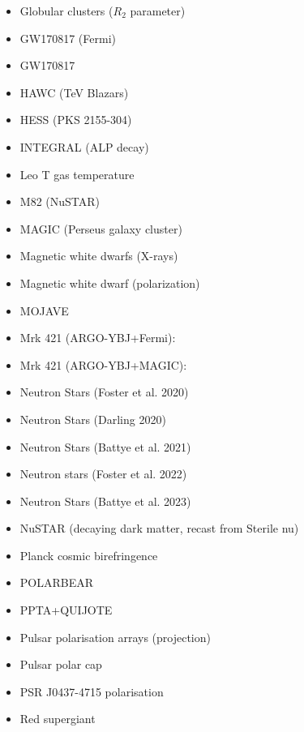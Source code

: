 \documentclass[8pt,twocolumn]{extarticle}
\begin{document}
\begin{mdframed}[everyline=true]
\begin{itemize}
    \item Globular clusters ($R_2$ parameter)~\cite{Dolan:2022kul}
    \item GW170817 (Fermi)~\cite{Dev:2023hax}
    \item GW170817 ~\cite{Diamond:2023cto}
    \item HAWC (TeV Blazars)~\cite{Jacobsen:2022swa}
    \item HESS (PKS 2155-304)~\cite{HESS:2013udx}
    \item INTEGRAL (ALP decay)~\cite{Calore:2022pks}
    \item Leo T gas temperature~\cite{Wadekar:2021qae}
    \item M82 (NuSTAR)~\cite{Ning:2024eky}
    \item MAGIC (Perseus galaxy cluster)~\cite{MAGIC:2024arq}
    \item Magnetic white dwarfs (X-rays)~\cite{Dessert:2021bkv}
    \item Magnetic white dwarf (polarization)~\cite{Dessert:2022yqq}
    \item MOJAVE~\cite{Ivanov:2018byi}
    \item Mrk 421 (ARGO-YBJ+Fermi):~\cite{Li:2020pcn}
    \item Mrk 421 (ARGO-YBJ+MAGIC):~\cite{Li:2021gxs}
    \item Neutron Stars (Foster et al. 2020)~\cite{Foster:2020pgt}
    \item Neutron Stars (Darling 2020)~\cite{Darling:2020uyo}
    \item Neutron Stars (Battye et al. 2021)~\cite{Battye:2021yue}
    \item Neutron stars (Foster et al. 2022)~\cite{Foster:2022fxn}
    \item Neutron Stars (Battye et al. 2023)~\cite{Battye:2023oac}
    \item NuSTAR (decaying dark matter, recast from Sterile nu)~\cite{Perez:2016tcq,Ng:2019gch,Roach:2022lgo}
   	\item Planck cosmic birefringence~\cite{Fedderke:2019ajk}
   	\item POLARBEAR~\cite{POLARBEAR:2023ric,POLARBEAR:2024vel}
    \item PPTA+QUIJOTE~\cite{Castillo:2022zfl}
    \item Pulsar polarisation arrays (projection)~\cite{Liu:2021zlt}
    \item Pulsar polar cap~\cite{Noordhuis:2022ljw}
    \item PSR J0437-4715 polarisation~\cite{Caputo:2019tms}
    \item Red supergiant~\cite{Severino:2022nue}

\end{itemize}
\end{mdframed}
\end{document}
